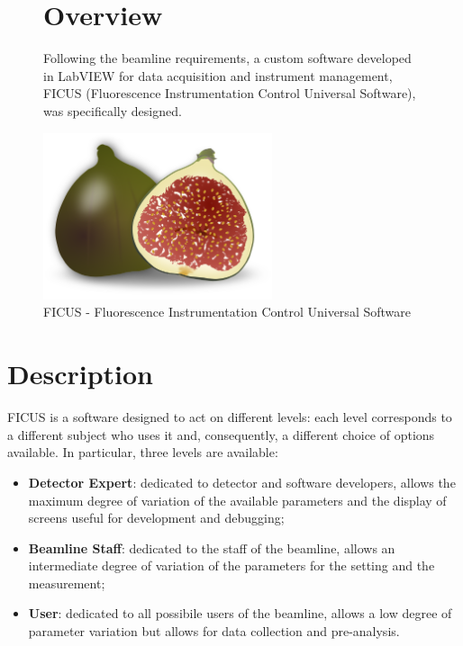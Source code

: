 \documentclass[a4paper,12pt,oneside,pdflatex,italian,final,twocolumn]{article}
\begin{document}
\begin{figure} [h]
\begin{minipage}{0.5\textwidth}
\section{Overview}
        Following the beamline requirements, a custom software developed in LabVIEW for data acquisition and instrument management, FICUS (Fluorescence Instrumentation Control Universal Software), was specifically designed.
        

\end{minipage}
\hfill
\begin{minipage}{0.4\textwidth}
\raggedleft
\includegraphics[width=0.6\textwidth,right]{ficus.png}
\caption{FICUS - Fluorescence Instrumentation Control Universal Software}\label{fig:fig0}
\end{minipage}
\end{figure}


        

        

	\clearpage
	
	        \section{Description}
        
       FICUS is a software designed to act on different levels: each level corresponds to a different subject who uses it and, consequently, a different choice of options available. In particular, three levels are available:
       \begin{itemize}
           \item \textbf{Detector Expert}: dedicated to detector and software developers, allows the maximum degree of variation of the available parameters and the display of screens useful for development and debugging;
           \item \textbf{Beamline Staff}: dedicated to the staff of the beamline, allows an intermediate degree of variation of the parameters for the setting and the measurement;
           \item \textbf{User}: dedicated to all possibile users of the beamline, allows a low degree of parameter variation but allows for data collection and pre-analysis.
       \end{itemize}
       
\end{document}
